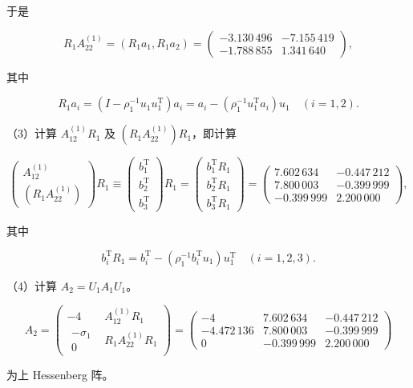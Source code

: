 \documentclass[
  10pt,
  fontset=fandol]{ctexart}
\begin{document}
于是

\[
R_1A_{22}^{(1)}=(R_1a_1,R_1a_2)
=\begin{pmatrix}-3.130\,496&-7.155\,419\\-1.788\,855&1.341\,640\end{pmatrix},
\]

其中

\[
R_1a_i=(I-\rho_1^{-1}u_1u_1^{\mathrm T})a_i
=a_i-(\rho_1^{-1}u_1^{\mathrm T}a_i)u_1\quad(i=1,2).
\]

（3）计算 \(A_{12}^{(1)}R_1\) 及 \((R_1A_{22}^{(1)})R_1\)，即计算

\[
\begin{pmatrix}A_{12}^{(1)}\\(R_1A_{22}^{(1)})\end{pmatrix}R_1
\equiv\begin{pmatrix}b_1^{\mathrm T}\\b_2^{\mathrm T}\\b_3^{\mathrm T}\end{pmatrix}R_1
=\begin{pmatrix}b_1^{\mathrm T}R_1\\b_2^{\mathrm T}R_1\\b_3^{\mathrm T}R_1\end{pmatrix}
=\begin{pmatrix}
7.602\,634&-0.447\,212\\
7.800\,003&-0.399\,999\\
-0.399\,999&2.200\,000
\end{pmatrix},
\]

其中

\[
b_i^{\mathrm T}R_1=b_i^{\mathrm T}-(\rho_1^{-1}b_i^{\mathrm T}u_1)u_1^{\mathrm T}
\quad(i=1,2,3).
\]

（4）计算 \(A_2=U_1A_1U_1\)。

\[
A_2=\begin{pmatrix}-4&A_{12}^{(1)}R_1\\
\begin{matrix}-\sigma_1\\0\end{matrix}&R_1A_{22}^{(1)}R_1
\end{pmatrix}
=\begin{pmatrix}
-4&7.602\,634&-0.447\,212\\
-4.472\,136&7.800\,003&-0.399\,999\\
0&-0.399\,999&2.200\,000
\end{pmatrix}
\]

为上 Hessenberg 阵。
\end{document}
